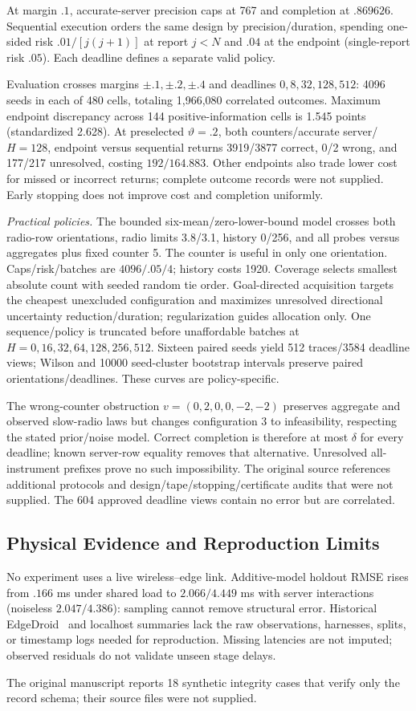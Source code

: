 At margin $.1$, accurate-server precision caps at 767 and completion at $.869626$. Sequential execution orders the same design by precision/duration, spending one-sided risk $.01/[j(j+1)]$ at report $j<N$ and $.04$ at the endpoint (single-report risk $.05$). Each deadline defines a separate valid policy.

Evaluation crosses margins $\pm.1,\pm.2,\pm.4$ and deadlines $0,8,32,128,512$: 4096 seeds in each of 480 cells, totaling 1,966,080 correlated outcomes. Maximum endpoint discrepancy across 144 positive-information cells is 1.545 points (standardized 2.628). At preselected $\vartheta=.2$, both counters/accurate server/$H=128$, endpoint versus sequential returns 3919/3877 correct, 0/2 wrong, and 177/217 unresolved, costing $192/164.883$. Other endpoints also trade lower cost for missed or incorrect returns; complete outcome records were not supplied. Early stopping does not improve cost and completion uniformly.

\emph{Practical policies.} The bounded six-mean/zero-lower-bound model crosses both radio-row orientations, radio limits 3.8/3.1, history 0/256, and all probes versus aggregates plus fixed counter 5. The counter is useful in only one orientation. Caps/risk/batches are $4096/.05/4$; history costs 1920. Coverage selects smallest absolute count with seeded random tie order. Goal-directed acquisition targets the cheapest unexcluded configuration and maximizes unresolved directional uncertainty reduction/duration; regularization guides allocation only. One sequence/policy is truncated before unaffordable batches at $H=0,16,32,64,128,256,512$. Sixteen paired seeds yield 512 traces/3584 deadline views; Wilson and 10000 seed-cluster bootstrap intervals preserve paired orientations/deadlines. These curves are policy-specific.

The wrong-counter obstruction $v=(0,2,0,0,-2,-2)$ preserves aggregate and observed slow-radio laws but changes configuration 3 to infeasibility, respecting the stated prior/noise model. Correct completion is therefore at most $\delta$ for every deadline; known server-row equality removes that alternative. Unresolved all-instrument prefixes prove no such impossibility. The original source references additional protocols and design/tape/stopping/certificate audits that were not supplied. The 604 approved deadline views contain no error but are correlated.

\subsection{Physical Evidence and Reproduction Limits}
\label{app:deployment-protocol}
No experiment uses a live wireless--edge link. Additive-model holdout RMSE rises from $.166$ ms under shared load to $2.066/4.449$ ms with server interactions (noiseless $2.047/4.386$): sampling cannot remove structural error. Historical EdgeDroid~\cite{edgedroid2019} and localhost summaries lack the raw observations, harnesses, splits, or timestamp logs needed for reproduction. Missing latencies are not imputed; observed residuals do not validate unseen stage delays.

The original manuscript reports 18 synthetic integrity cases that verify only the record schema; their source files were not supplied.
